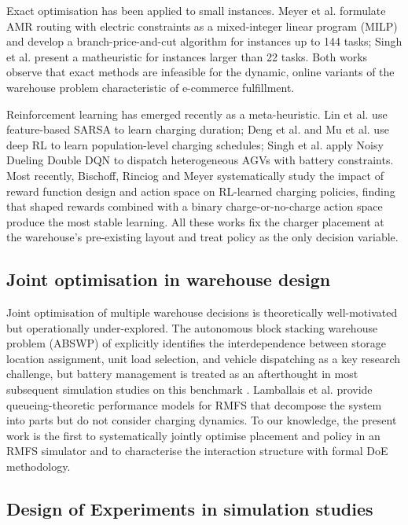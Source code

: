 \documentclass[conference]{IEEEtran}
\begin{document}
Exact optimisation has been applied to small instances. Meyer et al. \cite{meyer2024} formulate AMR routing with electric constraints as a mixed-integer linear program (MILP) and develop a branch-price-and-cut algorithm for instances up to 144 tasks; Singh et al. \cite{singh2022} present a matheuristic for instances larger than 22 tasks. Both works observe that exact methods are infeasible for the dynamic, online variants of the warehouse problem characteristic of e-commerce fulfillment.

Reinforcement learning has emerged recently as a meta-heuristic. Lin et al. \cite{lin2023} use feature-based SARSA to learn charging duration; Deng et al. \cite{deng2020} and Mu et al. \cite{mu2022} use deep RL to learn population-level charging schedules; Singh et al. \cite{singh2024} apply Noisy Dueling Double DQN to dispatch heterogeneous AGVs with battery constraints. Most recently, Bischoff, Rinciog and Meyer \cite{bischoff2025} systematically study the impact of reward function design and action space on RL-learned charging policies, finding that shaped rewards combined with a binary charge-or-no-charge action space produce the most stable learning. All these works fix the charger placement at the warehouse's pre-existing layout and treat policy as the only decision variable.

\subsection{Joint optimisation in warehouse design}

Joint optimisation of multiple warehouse decisions is theoretically well-motivated \cite{pfrommer2020,boysen2019} but operationally under-explored. The autonomous block stacking warehouse problem (ABSWP) of \cite{pfrommer2020} explicitly identifies the interdependence between storage location assignment, unit load selection, and vehicle dispatching as a key research challenge, but battery management is treated as an afterthought in most subsequent simulation studies on this benchmark \cite{pfrommer2022}. Lamballais et al. \cite{lamballais2017} provide queueing-theoretic performance models for RMFS that decompose the system into parts but do not consider charging dynamics. To our knowledge, the present work is the first to systematically jointly optimise placement and policy in an RMFS simulator and to characterise the interaction structure with formal DoE methodology.

\subsection{Design of Experiments in simulation studies}
\end{document}
